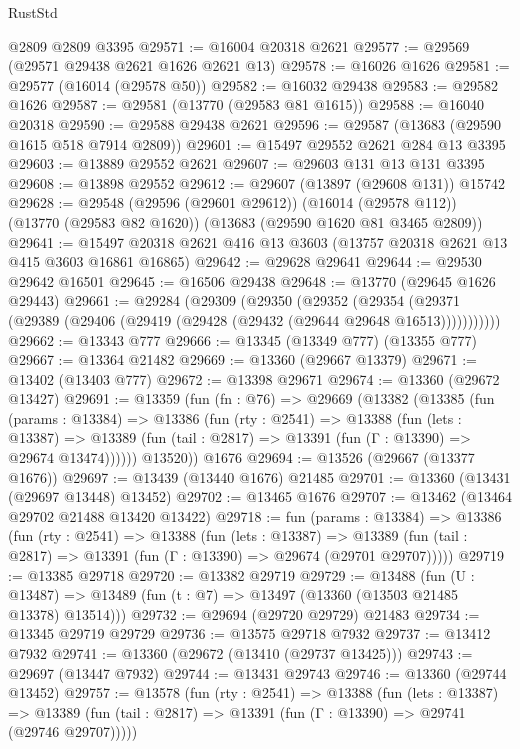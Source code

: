 \begin{lexlean}{RustStd}
\begin{coremodule}
    @2809
    @2809
    @3395
@29571 := @16004 @20318 @2621
@29577 := @29569 (@29571 @29438 @2621 @1626 @2621 @13)
@29578 := @16026 @1626
@29581 := @29577 (@16014 (@29578 @50))
@29582 := @16032 @29438
@29583 := @29582 @1626
@29587 := @29581 (@13770 (@29583 @81 @1615))
@29588 := @16040 @20318
@29590 := @29588 @29438 @2621
@29596 := @29587 (@13683 (@29590 @1615 @518 @7914 @2809))
@29601 := @15497 @29552 @2621 @284 @13 @3395
@29603 := @13889 @29552 @2621
@29607 := @29603 @131 @13 @131 @3395
@29608 := @13898 @29552
@29612 := @29607 (@13897 (@29608 @131)) @15742
@29628 := @29548
    (@29596 (@29601 @29612))
    (@16014 (@29578 @112))
    (@13770 (@29583 @82 @1620))
    (@13683 (@29590 @1620 @81 @3465 @2809))
@29641 := @15497 @20318 @2621 @416 @13 @3603 (@13757 @20318 @2621 @13 @415 @3603 @16861 @16865)
@29642 := @29628 @29641
@29644 := @29530 @29642 @16501
@29645 := @16506 @29438
@29648 := @13770 (@29645 @1626 @29443)
@29661 := @29284
    (@29309
      (@29350
        (@29352
          (@29354 (@29371 (@29389 (@29406 (@29419 (@29428 (@29432 (@29644 @29648 @16513)))))))))))
@29662 := @13343 @777
@29666 := @13345 (@13349 @777) (@13355 @777)
@29667 := @13364 @21482
@29669 := @13360 (@29667 @13379)
@29671 := @13402 (@13403 @777)
@29672 := @13398 @29671
@29674 := @13360 (@29672 @13427)
@29691 := @13359
    (fun (fn : @76) =>
    @29669
      (@13382
        (@13385
          (fun (params : @13384) =>
          @13386
            (fun (rty : @2541) =>
            @13388
              (fun (lets : @13387) =>
              @13389 (fun (tail : @2817) => @13391 (fun (Γ : @13390) => @29674 @13474))))))
        @13520))
    @1676
@29694 := @13526 (@29667 (@13377 @1676))
@29697 := @13439 (@13440 @1676) @21485
@29701 := @13360 (@13431 (@29697 @13448) @13452)
@29702 := @13465 @1676
@29707 := @13462 (@13464 @29702 @21488 @13420 @13422)
@29718 := fun (params : @13384) =>
  @13386
    (fun (rty : @2541) =>
    @13388
      (fun (lets : @13387) =>
      @13389 (fun (tail : @2817) => @13391 (fun (Γ : @13390) => @29674 (@29701 @29707)))))
@29719 := @13385 @29718
@29720 := @13382 @29719
@29729 := @13488
    (fun (U : @13487) => @13489 (fun (t : @7) => @13497 (@13360 (@13503 @21485 @13378) @13514)))
@29732 := @29694 (@29720 @29729) @21483
@29734 := @13345 @29719 @29729
@29736 := @13575 @29718 @7932
@29737 := @13412 @7932
@29741 := @13360 (@29672 (@13410 (@29737 @13425)))
@29743 := @29697 (@13447 @7932)
@29744 := @13431 @29743
@29746 := @13360 (@29744 @13452)
@29757 := @13578
    (fun (rty : @2541) =>
    @13388
      (fun (lets : @13387) =>
      @13389 (fun (tail : @2817) => @13391 (fun (Γ : @13390) => @29741 (@29746 @29707)))))

\end{coremodule}
\end{lexlean}
